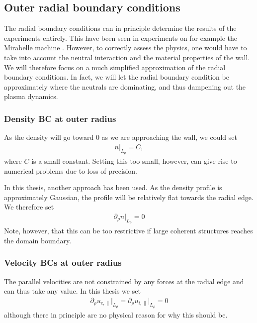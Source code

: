 \subsection{Outer radial boundary conditions}
\label{sec:outerBC}
%
The radial boundary conditions can in principle determine the results of the experiments entirely.
This have been seen in experiments on for example the Mirabelle machine \cite{Schroder2001}.
However, to correctly assess the physics, one would have to take into account the neutral interaction and the material properties of the wall.
We will therefore focus on a much simplified approximation of the radial boundary conditions.
In fact, we will let the radial boundary condition be approximately where the neutrals are dominating, and thus dampening out the plasma dynamics.

\subsubsection{Density BC at outer radius}
As the density will go toward $0$ as we are approaching the wall, we could set
%
\begin{align*}
    n \bigg|_{L_\rho} = C,
\end{align*}
%
where $C$ is a small constant.
Setting this too small, however, can give rise to numerical problems due to loss of precision.

In this thesis, another approach has been used.
As the density profile is approximately Gaussian, the profile will be relatively flat towards the radial edge.
We therefore set
%
\begin{align*}
    \partial_\rho n \bigg|_{L_\rho} = 0
\end{align*}
%
Note, however, that this can be too restrictive if large coherent structures reaches the domain boundary.

\subsubsection{Velocity BCs at outer radius}
%
The parallel velocities are not constrained by any forces at the radial edge and can thus take any value.
In this thesis we set
%
\begin{align*}
    \partial_\rho u_{e,\|} \bigg|_{L_\rho} = \partial_\rho u_{i,\|} \bigg|_{L_\rho} = 0
\end{align*}
%
although there in principle are no physical reason for why this should be.

